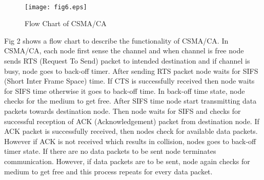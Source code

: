 \documentclass[11pt, conference, compsocconf, onecolumn]{IEEEtran}
\begin{document}
\\
\begin{figure}[!h]
\centering
\caption{Flow Chart of CSMA/CA}
\texttt{[image: fig6.eps]}
\end{figure}
Fig 2 shows a flow chart to describe the functionality of CSMA/CA. In CSMA/CA, each node first sense the channel and when channel is free node sends RTS (Request To Send) packet to intended destination and if channel is busy, node goes to back-off timer. After sending RTS packet node waits for SIFS (Short Inter Frame Space) time. If CTS is successfully received then node waits for SIFS time otherwise it goes to back-off time. In back-off time state, node checks for the medium to get free. After SIFS time node start transmitting data packets towards destination node. Then node waits for SIFS and checks for successful reception of ACK (Acknowledgement) packet from destination node. If ACK packet is successfully received, then nodes check for available data packets. However if ACK is not received which results in collision, nodes goes to back-off timer state. If there are no data packets to be sent node terminates communication. However, if data packets are to be sent, node again checks for medium to get free and this process repeats for every data packet.
\end{document}
